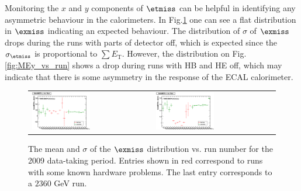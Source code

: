 Monitoring the $x$ and $y$ components of $\etmiss$ can be helpful in
identifying any asymmetric behaviour in the
calorimeters. In Fig.\ref{fig:MEx_vs_run} one can see a flat
distribution in $\exmiss$ indicating an expected behaviour. The
distribution of $\sigma$ of $\exmiss$ drops during the runs with parts of
detector off, which is expected since the $\sigma_{\etmiss}$ is
proportional to $\sum E_\text{T}$. However, the distribution on
Fig.\ref{fig:MEy_vs_run} shows a drop during runs with HB and HE off,
which may indicate that there is some asymmetry in the response of the
ECAL calorimeter.

\begin{figure}[h!]
  \centering
  \begin{tabular}{ll}
    \includegraphics[width=0.5\textwidth]{plots_METStability/h_calometPxMean_vs_run.eps} &
    \includegraphics[width=0.5\textwidth]{plots_METStability/h_calometPxSigma_vs_run.eps} \\
  \end{tabular}
  \caption{\small The mean and $\sigma$ of the $\exmiss$ distribution
    vs. run number for the 2009 data-taking period.  Entries shown in
    red correspond to runs with some known hardware problems. The last
    entry corresponds to a $2360$ GeV run.\label{fig:MEx_vs_run}}
\end{figure}

